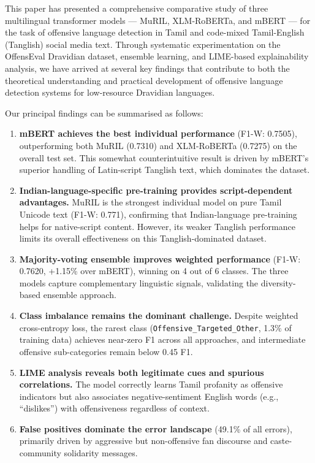 \documentclass[12pt, a4paper]{article}
\begin{document}
This paper has presented a comprehensive comparative study of three multilingual transformer models --- MuRIL, XLM-RoBERTa, and mBERT --- for the task of offensive language detection in Tamil and code-mixed Tamil-English (Tanglish) social media text. Through systematic experimentation on the OffensEval Dravidian dataset, ensemble learning, and LIME-based explainability analysis, we have arrived at several key findings that contribute to both the theoretical understanding and practical development of offensive language detection systems for low-resource Dravidian languages.

Our principal findings can be summarised as follows:

\begin{enumerate}[leftmargin=2em]
    \item \textbf{mBERT achieves the best individual performance} (F1-W: 0.7505), outperforming both MuRIL (0.7310) and XLM-RoBERTa (0.7275) on the overall test set. This somewhat counterintuitive result is driven by mBERT's superior handling of Latin-script Tanglish text, which dominates the dataset.
    
    \item \textbf{Indian-language-specific pre-training provides script-dependent advantages.} MuRIL is the strongest individual model on pure Tamil Unicode text (F1-W: 0.771), confirming that Indian-language pre-training helps for native-script content. However, its weaker Tanglish performance limits its overall effectiveness on this Tanglish-dominated dataset.
    
    \item \textbf{Majority-voting ensemble improves weighted performance} (F1-W: 0.7620, +1.15\% over mBERT), winning on 4 out of 6 classes. The three models capture complementary linguistic signals, validating the diversity-based ensemble approach.
    
    \item \textbf{Class imbalance remains the dominant challenge.} Despite weighted cross-entropy loss, the rarest class (\texttt{Offensive\_Targeted\_Other}, 1.3\% of training data) achieves near-zero F1 across all approaches, and intermediate offensive sub-categories remain below 0.45 F1.
    
    \item \textbf{LIME analysis reveals both legitimate cues and spurious correlations.} The model correctly learns Tamil profanity as offensive indicators but also associates negative-sentiment English words (e.g., ``dislikes'') with offensiveness regardless of context.
    
    \item \textbf{False positives dominate the error landscape} (49.1\% of all errors), primarily driven by aggressive but non-offensive fan discourse and caste-community solidarity messages.
\end{enumerate}
\end{document}
